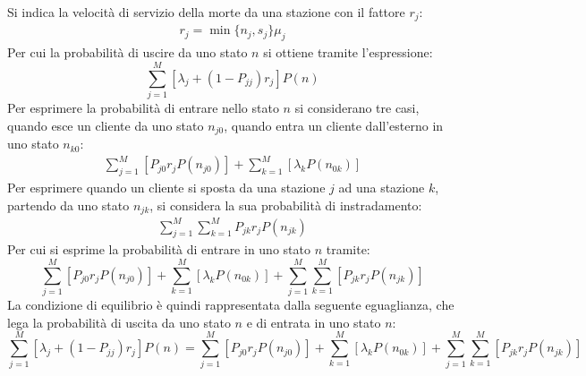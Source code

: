 \documentclass{article}
\numberwithin{equation}{subsection}
\begin{document}
Si indica la velocità di servizio della morte da una stazione con il fattore $r_j$:
\begin{gather*}
    r_j=\min\{n_j,s_j\}\mu_j
\end{gather*}
Per cui la probabilità di uscire da uno stato $n$ si ottiene tramite l'espressione:
\begin{equation*}
    \displaystyle\sum_{j=1}^M[\lambda_j+(1-P_{jj})r_j]P(n)
\end{equation*}
Per esprimere la probabilità di entrare nello stato $n$ si considerano tre casi, quando esce un cliente da uno stato $n_{j0}$, quando entra un cliente dall'esterno in 
uno stato $n_{k0}$: 
\begin{gather*}
    \displaystyle\sum_{j=1}^M\left[P_{j0}r_jP(n_{j0})\right]+\displaystyle\sum_{k=1}^M\left[\lambda_kP(n_{0k})\right]
\end{gather*}
Per esprimere quando un cliente si sposta da una stazione $j$ ad una stazione $k$, partendo da uno stato $n_{jk}$, si considera la sua probabilità di instradamento:
\begin{gather*}
    \displaystyle\sum_{j=1}^M\sum_{k=1}^MP_{jk}r_jP(n_{jk})
\end{gather*}
Per cui si esprime la probabilità di entrare in uno stato $n$ tramite:
\begin{equation*}
    \displaystyle\sum_{j=1}^M\left[P_{j0}r_jP(n_{j0})\right]+\displaystyle\sum_{k=1}^M\left[\lambda_kP(n_{0k})\right]+\sum_{j=1}^M\sum_{k=1}^M\left[P_{jk}r_jP(n_{jk})\right]
\end{equation*}
La condizione di equilibrio è quindi rappresentata dalla seguente eguaglianza, che lega la probabilità di uscita da uno stato $n$ e di entrata in uno stato $n$:
\begin{equation}
    \displaystyle\sum_{j=1}^M[\lambda_j+(1-P_{jj})r_j]P(n)=\sum_{j=1}^M\left[P_{j0}r_jP(n_{j0})\right]+\displaystyle\sum_{k=1}^M\left[\lambda_kP(n_{0k})\right]+\sum_{j=1}^M\sum_{k=1}^M\left[P_{jk}r_jP(n_{jk})\right]
\end{equation}
\end{document}

